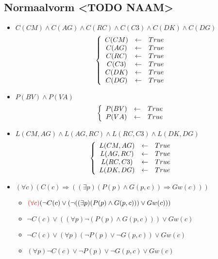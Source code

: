 \documentclass[alternative-exam.tex]{subfiles}
\begin{document}
\subsection{Normaalvorm <TODO NAAM>}
\begin{itemize}
\item $C(CM)\wedge C(AG)\wedge C(RC)\wedge C(C3)\wedge C(DK)\wedge C(DG)$
\[
\left\{
\begin{array}{c c c}
C(CM) &\leftarrow& True\\
C(AG) &\leftarrow& True\\
C(RC) &\leftarrow& True\\
C(C3) &\leftarrow& True\\
C(DK) &\leftarrow& True\\
C(DG) &\leftarrow& True\\
\end{array}
\right.
\]

\item $P(BV) \wedge P(VA)$
\[
\left\{
\begin{array}{c c c}
P(BV) &\leftarrow& True\\
P(VA) &\leftarrow& True\\
\end{array}
\right.
\]

\item $L(CM,AG) \wedge L(AG,RC) \wedge L(RC,C3) \wedge L(DK,DG)$
\[
\left\{
\begin{array}{c c c}
L(CM,AG) &\leftarrow& True\\
L(AG,RC) &\leftarrow& True\\
L(RC,C3) &\leftarrow& True\\
L(DK,DG) &\leftarrow& True\\
\end{array}
\right.
\]

\item $(\forall c)(C(c) \Rightarrow ((\exists p) (P(p) \wedge G(p,c)) \Rightarrow Gw(c)))$
\begin{itemize}
\item $ {\color{red}(\forall c)} (\neg C(c) \vee (\neg ((\exists p)(P(p)\wedge G(p,c))) \vee Gw(c)))$

\item $\neg C(c) \vee ((\forall p)\neg(P(p)\wedge G(p,c))) \vee Gw(c)$

\item $\neg C(c) \vee (\forall p)(\neg P(p)\vee \neg G(p,c)) \vee Gw(c)$

\item $(\forall p) \neg C(c) \vee \neg P(p) \vee \neg G(p,c) \vee Gw(c)$


\end{itemize}
\end{itemize}
\end{document}
